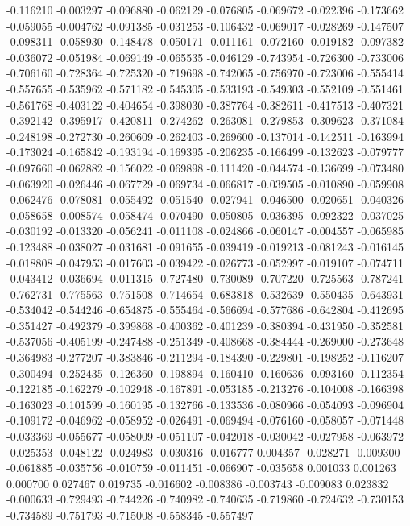 -0.116210
-0.003297
-0.096880
-0.062129
-0.076805
-0.069672
-0.022396
-0.173662
-0.059055
-0.004762
-0.091385
-0.031253
-0.106432
-0.069017
-0.028269
-0.147507
-0.098311
-0.058930
-0.148478
-0.050171
-0.011161
-0.072160
-0.019182
-0.097382
-0.036072
-0.051984
-0.069149
-0.065535
-0.046129
-0.743954
-0.726300
-0.733006
-0.706160
-0.728364
-0.725320
-0.719698
-0.742065
-0.756970
-0.723006
-0.555414
-0.557655
-0.535962
-0.571182
-0.545305
-0.533193
-0.549303
-0.552109
-0.551461
-0.561768
-0.403122
-0.404654
-0.398030
-0.387764
-0.382611
-0.417513
-0.407321
-0.392142
-0.395917
-0.420811
-0.274262
-0.263081
-0.279853
-0.309623
-0.371084
-0.248198
-0.272730
-0.260609
-0.262403
-0.269600
-0.137014
-0.142511
-0.163994
-0.173024
-0.165842
-0.193194
-0.169395
-0.206235
-0.166499
-0.132623
-0.079777
-0.097660
-0.062882
-0.156022
-0.069898
-0.111420
-0.044574
-0.136699
-0.073480
-0.063920
-0.026446
-0.067729
-0.069734
-0.066817
-0.039505
-0.010890
-0.059908
-0.062476
-0.078081
-0.055492
-0.051540
-0.027941
-0.046500
-0.020651
-0.040326
-0.058658
-0.008574
-0.058474
-0.070490
-0.050805
-0.036395
-0.092322
-0.037025
-0.030192
-0.013320
-0.056241
-0.011108
-0.024866
-0.060147
-0.004557
-0.065985
-0.123488
-0.038027
-0.031681
-0.091655
-0.039419
-0.019213
-0.081243
-0.016145
-0.018808
-0.047953
-0.017603
-0.039422
-0.026773
-0.052997
-0.019107
-0.074711
-0.043412
-0.036694
-0.011315
-0.727480
-0.730089
-0.707220
-0.725563
-0.787241
-0.762731
-0.775563
-0.751508
-0.714654
-0.683818
-0.532639
-0.550435
-0.643931
-0.534042
-0.544246
-0.654875
-0.555464
-0.566694
-0.577686
-0.642804
-0.412695
-0.351427
-0.492379
-0.399868
-0.400362
-0.401239
-0.380394
-0.431950
-0.352581
-0.537056
-0.405199
-0.247488
-0.251349
-0.408668
-0.384444
-0.269000
-0.273648
-0.364983
-0.277207
-0.383846
-0.211294
-0.184390
-0.229801
-0.198252
-0.116207
-0.300494
-0.252435
-0.126360
-0.198894
-0.160410
-0.160636
-0.093160
-0.112354
-0.122185
-0.162279
-0.102948
-0.167891
-0.053185
-0.213276
-0.104008
-0.166398
-0.163023
-0.101599
-0.160195
-0.132766
-0.133536
-0.080966
-0.054093
-0.096904
-0.109172
-0.046962
-0.058952
-0.026491
-0.069494
-0.076160
-0.058057
-0.071448
-0.033369
-0.055677
-0.058009
-0.051107
-0.042018
-0.030042
-0.027958
-0.063972
-0.025353
-0.048122
-0.024983
-0.030316
-0.016777
0.004357
-0.028271
-0.009300
-0.061885
-0.035756
-0.010759
-0.011451
-0.066907
-0.035658
0.001033
0.001263
0.000700
0.027467
0.019735
-0.016602
-0.008386
-0.003743
-0.009083
0.023832
-0.000633
-0.729493
-0.744226
-0.740982
-0.740635
-0.719860
-0.724632
-0.730153
-0.734589
-0.751793
-0.715008
-0.558345
-0.557497
